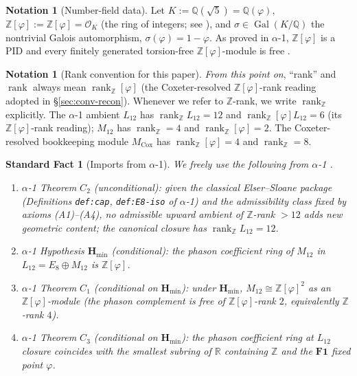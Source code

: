 \documentclass[11pt, a4paper]{amsart}
\newtheorem{fact}[theorem]{Standard Fact}
\theoremstyle{definition}
\newtheorem{notation}[theorem]{Notation}
\newcommand{\R}{\mathbb{R}}
\newcommand{\Q}{\mathbb{Q}}
\newcommand{\Z}{\mathbb{Z}}
\newcommand{\rk}{\operatorname{rank}}
\newcommand{\Gal}{\operatorname{Gal}}
\newcommand{\Hmin}{\mathbf{H}_{\min}}
\newcommand{\Ophi}{\mathbb{Z}[\varphi]}
\newcommand{\Mcox}{M_{\mathrm{Cox}}}
\newcommand{\Mtw}{M_{12}}
\begin{document}
\begin{notation}[Number-field data]
\label{not:K}
Let $K := \Q(\sqrt 5) = \Q(\varphi)$, $\Ophi := \Z[\varphi]
= \mathcal O_K$ (the ring of integers; see
\cite[Ch.~2, Thm.~1]{Marcus}), and $\sigma \in \Gal(K / \Q)$
the nontrivial Galois automorphism, $\sigma(\varphi) = 1 -
\varphi$. As proved in $\alpha$-1, $\Ophi$ is a PID
\cite[Lem.~lem:pid]{Cascade12D} and every finitely generated
torsion-free $\Ophi$-module is free
\cite[Lem.~lem:pid-free]{Cascade12D}.
\end{notation}

\begin{notation}[Rank convention for this paper]
\label{not:rank-conv}
\emph{From this point on}, ``rank'' and $\rk$ always mean
$\rk_\Ophi$ (the Coxeter-resolved $\Ophi$-rank reading
adopted in \S\ref{sec:conv-recon}). Whenever we refer to
$\Z$-rank, we write $\rk_\Z$ explicitly. The $\alpha$-1
ambient $L_{12}$ has $\rk_\Z L_{12} = 12$ and $\rk_\Ophi
L_{12} = 6$ (its $\Ophi$-rank reading); $\Mtw$ has
$\rk_\Z = 4$ and $\rk_\Ophi = 2$. The Coxeter-resolved
bookkeeping module $\Mcox$ has $\rk_\Ophi = 4$ and
$\rk_\Z = 8$.
\end{notation}

\begin{fact}[Imports from $\alpha$-1]
\label{fact:alpha1-imports}
We freely use the following from
$\alpha$-1 \cite{Cascade12D}.
\begin{enumerate}
\item[(a)] $\alpha$-1 Theorem $C_2$ (\emph{unconditional}):
  given the classical Elser--Sloane package
  (Definitions \texttt{def:cap}, \texttt{def:E8-iso} of
  $\alpha$-1) and the admissibility class fixed by
  axioms (A1)--(A4), no admissible upward ambient of
  $\Z$-rank $> 12$ adds new geometric content; the canonical
  closure has $\rk_\Z L_{12} = 12$.
\item[(b)] $\alpha$-1 Hypothesis $\Hmin$
  (\emph{conditional}): the phason coefficient ring of
  $\Mtw$ in $L_{12} = E_8 \oplus \Mtw$ is $\Ophi$.
\item[(c)] $\alpha$-1 Theorem $C_1$ (\emph{conditional on
  $\Hmin$}): under $\Hmin$, $\Mtw \cong \Ophi^{2}$ as an
  $\Ophi$-module (the phason complement is free of
  $\Ophi$-rank $2$, equivalently $\Z$-rank $4$).
\item[(d)] $\alpha$-1 Theorem $C_3$ (\emph{conditional on
  $\Hmin$}): the phason coefficient ring at $L_{12}$ closure
  coincides with the smallest subring of $\R$ containing
  $\Z$ and the $\mathbf{F1}$ fixed point $\varphi$.
\end{enumerate}
\end{fact}
\end{document}

